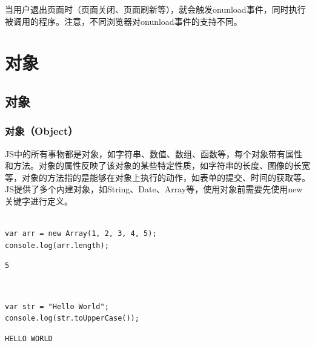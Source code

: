 当用户退出页面时（页面关闭、页面刷新等），就会触发onunload事件，同时执行被调用的程序。注意，不同浏览器对onunload事件的支持不同。

\newpage

\chapter{对象}

\section{对象}

\subsection{对象（Object）}

JS中的所有事物都是对象，如字符串、数值、数组、函数等，每个对象带有属性和方法。对象的属性反映了该对象的某些特定性质，如字符串的长度、图像的长宽等，对象的方法指的是能够在对象上执行的动作，如表单的提交、时间的获取等。\\

JS提供了多个内建对象，如String、Date、Array等，使用对象前需要先使用new关键字进行定义。\\

\\

\begin{lstlisting}[style=htmlcssjs]
var arr = new Array(1, 2, 3, 4, 5);
console.log(arr.length);
\end{lstlisting}

\begin{tcolorbox}
	\begin{verbatim}
5
	\end{verbatim}
\end{tcolorbox}

\vspace{0.5cm}

\\

\begin{lstlisting}[style=htmlcssjs]
var str = "Hello World";
console.log(str.toUpperCase());
\end{lstlisting}

\begin{tcolorbox}
	\begin{verbatim}
HELLO WORLD
	\end{verbatim}
\end{tcolorbox}

